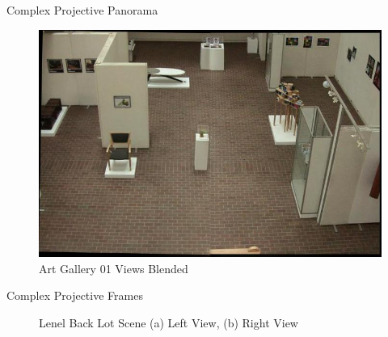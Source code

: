 \documentclass{beamer}
\begin{document}
\begin{frame}[c]{\sc Complex Projective Panorama}

\begin{figure}[!h]
\centering
\includegraphics[width=.9\columnwidth]{AGS1SP001001}
\caption{Art Gallery 01 Views Blended}
\label{ArtGallery1Stitched}
\end{figure}

\end{frame}


\begin{frame}[c]{\sc Complex Projective Frames}

\begin{figure}[!h]
\centering
{}
\caption{Lenel Back Lot Scene (a) Left View, (b) Right View}
\label{Lenel10Images}
\end{figure}

\end{frame}
\end{document}
